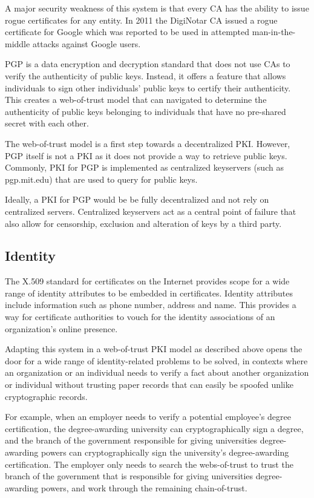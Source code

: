 \documentclass[a4paper]{report}
\begin{document}
	A major security weakness of this system is that every CA has the ability to issue rogue certificates for any entity. In 2011 the DigiNotar CA issued a rogue certificate for Google which was reported to be used in attempted man-in-the-middle attacks against Google users\cite{7}.

	PGP is a data encryption and decryption standard that does not use CAs to verify the authenticity of public keys. Instead, it offers a feature that allows individuals to sign other individuals' public keys to certify their authenticity. This creates a web-of-trust model that can navigated to determine the authenticity of public keys belonging to individuals that have no pre-shared secret with each other.\cite{2}

	The web-of-trust model is a first step towards a decentralized PKI. However, PGP itself is not a PKI as it does not provide a way to retrieve public keys. Commonly, PKI for PGP is implemented as centralized keyservers (such as pgp.mit.edu) that are used to query for public keys.

	Ideally, a PKI for PGP would be be fully decentralized and not rely on centralized servers. Centralized keyservers act as a central point of failure that also allow for censorship, exclusion and alteration of keys by a third party.
	
	\subsection{Identity}
	The X.509 standard for certificates on the Internet provides scope for a wide range of identity attributes to be embedded in certificates.\cite{8} Identity attributes include information such as phone number, address and name. This provides a way for certificate authorities to vouch for the identity associations of an organization's online presence.
	
	Adapting this system in a web-of-trust PKI model as described above opens the door for a wide range of identity-related problems to be solved, in contexts where an organization or an individual needs to verify a fact about another organization or individual without trusting paper records that can easily be spoofed unlike cryptographic records.
	
	For example, when an employer needs to verify a potential employee's degree certification, the degree-awarding university can cryptographically sign a degree, and the branch of the government responsible for giving universities degree-awarding powers can cryptographically sign the university's degree-awarding certification. The employer only needs to search the webs-of-trust to trust the branch of the government that is responsible for giving universities degree-awarding powers, and work through the remaining chain-of-trust.
	
\end{document}
